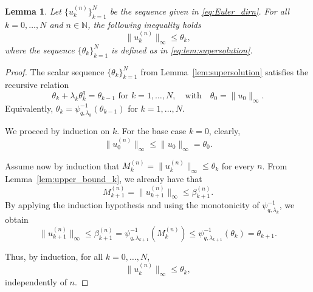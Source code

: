 \documentclass[10pt,a4paper]{amsart}
\newtheorem{lemma}{Lemma}
\newcommand{\N}{\mathbb{N}}
\begin{document}
\begin{lemma}\label{lem:upper_barrier_bound}
Let $\{u_k^{(n)}\}_{k=1}^N$ be the sequence given in \eqref{eq:Euler_dirn}. For all $k=0,\ldots, N$ and $n\in \N$, the following inequality holds 
$$\|u_k^{(n)}\|_\infty \leq \theta_k,$$ where the sequence $\{\theta_k\}_{k=1}^N$ is defined as in \eqref{eq:lem:supersolution}.
\end{lemma}

\begin{proof}
The scalar sequence $\{\theta_k\}_{k=1}^N$ from Lemma~\ref{lem:supersolution} satisfies the recursive relation
\[
\theta_k + \lambda_k\theta_k^{q} = \theta_{k-1} \mbox{ for } k=1,\ldots, N, \quad \text{with} \quad \theta_0 = \|u_0\|_\infty.
\]
Equivalently, $\theta_k = \psi_{q,\lambda_k}^{-1}(\theta_{k-1})$ for $k=1,\ldots, N$.

We proceed by induction on $k$. For the base case $k=0$, clearly,
\[
\|u_0^{(n)}\|_\infty \leq \|u_0\|_\infty = \theta_0.
\]


Assume now by induction that $M_{k}^{(n)} = \|u_{k}^{(n)}\|_\infty \leq \theta_k$ for every $n$. From Lemma~\ref{lem:upper_bound_k}, we already have that
\[
M_{k+1}^{(n)} = \|u_{k+1}^{(n)}\|_\infty \leq \beta_{k+1}^{(n)}.
\]
By applying the induction hypothesis and using the monotonicity of $\psi_{q,\lambda_k}^{-1}$, we obtain
\[
\|u_{k+1}^{(n)}\|_\infty \leq \beta_{k+1}^{(n)} = \psi_{q,\lambda_{k+1}}^{-1}(M_{k}^{(n)}) \leq \psi_{q,\lambda_{k+1}}^{-1}(\theta_k) = \theta_{k+1}.
\]


Thus, by induction, for all $k = 0, \ldots, N$,
\[
\|u_k^{(n)}\|_\infty \leq \theta_k,
\]
independently of $n$.
\end{proof}
\end{document}
